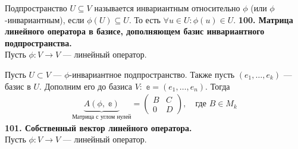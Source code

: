 \documentclass{article}
\begin{document}
Подпространство $U \subseteq V$ называется инвариантным относительно $\phi$ (или $\phi$-инвариантным), если $\phi(U)\subseteq U$. То есть $\forall u\in U \colon \phi(u)\in U$. 
\newline
\newline
\textbf{100. Матрица линейного оператора в базисе, дополняющем базис инвариантного подпространства.}\\
Пусть $\phi\colon V \rightarrow V$ --- линейный оператор.

Пусть $U\subset V$ --- $\phi$-инвариантное подпространство. Также пусть $(e_1, \ldots, e_k)$ --- базис в $U$. Дополним его до базиса $V\colon$ $\mathbb{e} = (e_1, \ldots, e_n)$. Тогда
\begin{gather}
    \underbrace{A(\phi,\;\mathbb{e})}_{\text{Матрица с углом нулей}} = \begin{pmatrix}
    B& C \\
    0& D
    \end{pmatrix}, \quad\text{где $B\in M_k$}
\end{gather}
\newline
\newline
\textbf{101. Собственный вектор линейного оператора.}\\
Пусть $\phi\colon V \rightarrow V$ --- линейный оператор.
\end{document}
